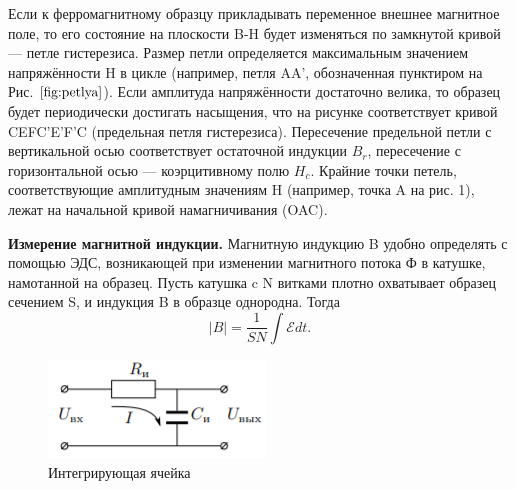 Если к ферромагнитному образцу прикладывать переменное внешнее
магнитное поле, то его состояние на плоскости B-H будет изменяться
по замкнутой кривой — петле гистерезиса. Размер петли определяется
максимальным значением напряжённости H в цикле (например, петля AA',
обозначенная пунктиром на Рис. $\ref{fig:petlya}$). Если амплитуда напряжённости достаточно велика, то образец будет периодически достигать насыщения,
что на рисунке соответствует кривой CEFC'E'F'C (предельная петля
гистерезиса). Пересечение предельной петли с вертикальной осью соответствует остаточной индукции $B_r$, пересечение с горизонтальной осью
— коэрцитивному полю $H_c$. Крайние точки петель, соответствующие амплитудным значениям H (например, точка A на рис. 1), лежат на начальной кривой намагничивания (OAC).

\textbf{Измерение магнитной индукции.} Магнитную индукцию B удобно
определять с помощью ЭДС, возникающей при изменении магнитного
потока Ф в катушке, намотанной на образец. Пусть катушка c N витками плотно охватывает образец сечением S, и индукция B в образце
однородна. Тогда
\begin{equation}
    |B|=\frac{1}{SN}\int\mathcal{E} dt.
    \label{eq:|B|}
\end{equation}
\begin{figure}
    \includegraphics[width=\linewidth]{int.png}
    \caption{Интегрирующая ячейка}
    \label{fig:int}
\end{figure}

